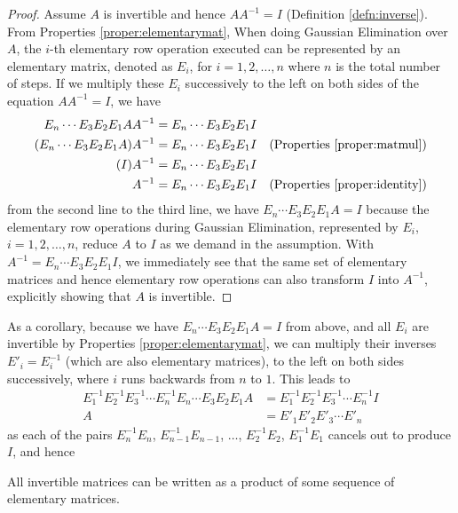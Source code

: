 \begin{proof}
Assume $A$ is invertible and hence $AA^{-1} = I$ (Definition \ref{defn:inverse}). From Properties \ref{proper:elementarymat}, When doing Gaussian Elimination over $A$, the $i$-th elementary row operation executed can be represented by an elementary matrix, denoted as $E_{i}$, for $i = 1,2,\ldots,n$ where $n$ is the total number of steps. If we multiply these $E_{i}$ successively to the left on both sides of the equation $AA^{-1} = I$, we have
\begin{align*}
E_n \cdots E_{3}E_{2}E_{1} AA^{-1} &= E_n \cdots E_{3}E_{2}E_{1}I \\
(E_n \cdots E_{3}E_{2}E_{1}A) A^{-1} &= E_n \cdots E_{3}E_{2}E_{1}I & \text{(Properties \ref{proper:matmul})} \\
(I)A^{-1} &= E_n \cdots E_{3}E_{2}E_{1}I \\
A^{-1} &= E_n \cdots E_{3}E_{2}E_{1}I & \text{(Properties \ref{proper:identity})}
\end{align*}
from the second line to the third line, we have $E_n \cdots E_{3}E_{2}E_{1}A = I$ because the elementary row operations during Gaussian Elimination, represented by $E_i$, $i = 1,2,\ldots,n$, reduce $A$ to $I$ as we demand in the assumption. With $A^{-1} = E_n \cdots E_{3}E_{2}E_{1}I$, we immediately see that the same set of elementary matrices and hence elementary row operations can also transform $I$ into $A^{-1}$, explicitly showing that $A$ is invertible.    
\end{proof}
As a corollary, because we have $E_n \cdots E_{3}E_{2}E_{1}A = I$ from above, and all $E_i$ are invertible by Properties \ref{proper:elementarymat}, we can multiply their inverses $E'_i = E_i^{-1}$ (which are also elementary matrices), to the left on both sides successively, where $i$ runs backwards from $n$ to $1$. This leads to
\begin{align*}
E_{1}^{-1}E_{2}^{-1}E_{3}^{-1}\cdots E_n^{-1}E_n \cdots E_{3}E_{2}E_{1}A &= E_{1}^{-1}E_{2}^{-1}E_{3}^{-1}\cdots E_n^{-1}I \\
A &= E'_{1}E'_{2}E'_{3}\cdots E'_n
\end{align*}
as each of the pairs $E_n^{-1}E_n$, $E_{n-1}^{-1}E_{n-1}$, $\ldots$, $E_2^{-1}E_2$, $E_1^{-1}E_1$ cancels out to produce $I$, and hence
\begin{proper}
\label{proper:invseqelement}
All invertible matrices can be written as a product of some sequence of elementary matrices. 
\end{proper}

